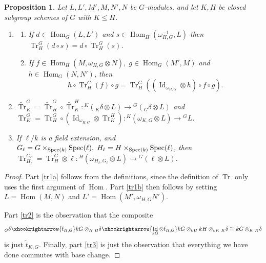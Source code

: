 \documentclass[12pt]{amsart}
\newtheorem{proposition}[theorem]{Proposition}
\theoremstyle{definition}
\newcommand{\Spec}{{\rm Spec }}
\DeclareMathOperator{\Hom}{Hom}
\DeclareMathOperator{\Tr}{Tr}
\DeclareMathOperator{\ide}{Id}
\begin{document}
\begin{proposition}\label{pr:properties-tr}
Let $L,L',M',M,N',N$ be $G$-modules, and let $K,H$ be closed subgroup schemes of $G$ with $K\leq H$.

\begin{enumerate}
\item 
\begin{enumerate}
	\item \label{tr1a}
	If $d \in \Hom_G(L,L')$ and $ s \in \Hom_H(\omega^{-1}_{H,G}, L)$ then $\Tr^G_H (d \circ s) = d \circ \Tr^G_H(s)$.
	\item \label{tr1b}
If $f \in \Hom_H (M,  \omega_{H,G} \otimes N), \; g \in \Hom_G (M',M)$ and $h \in \Hom_G (N,N')$, then 
\[
h \circ \Tr_H^G(f)\circ g = \Tr_H^G( ( \ide_{\omega_{H,G}} \otimes h) \circ f \circ g).
\]
\end{enumerate}

\item \label{tr2} $\tilde{\Tr}^G_K = \tilde{\Tr}^G_H \circ \tilde{\Tr}^H_K \! :  {}^K({}_K \delta  \otimes L) \rightarrow {}^G({}_G \delta  \otimes L)$ and 
$\Tr^G_K = \Tr^G_H \circ (\ide _{\omega_{H,G}} \otimes \Tr^H_K) \! :  {}^K( \omega_{K,G}  \otimes L) \rightarrow {}^GL$. 

\item \label{tr3} If $\ell /k$  is a field extension, and $G_\ell=G\times_{\Spec (k)} \Spec (\ell),\;H_\ell=H\times_{\Spec (k)} \Spec (\ell)$, then $  \Tr_{H_\ell}^{G_\ell} = \Tr_{H}^G \otimes \ell \! : 
{}^H(\omega_{H_\ell,G_\ell} \otimes L) \rightarrow {}^G(\ell \otimes L)$.

\end{enumerate}
\end{proposition}

\begin{proof}
	
	Part \ref{tr1a} follows from the definitions, since the definition of $\Tr$ only uses the first argument of $\Hom$. Part \ref{tr1b} then follows by setting $L= \Hom(M,N)$ and $L'=\Hom(M',\omega_{H,G}N')$.
	
	Part \ref{tr2} is the observation that the composite
	\[ {}_G \delta \xhookrightarrow{\tilde{t}_{H,G}} kG \otimes _H {}_H \delta \xhookrightarrow{\ide_{kG} \otimes \tilde{t}_{H,G}} kG \otimes_{kH}kH \otimes _{kK} {}_K \delta \cong kG \otimes_K {}_K \delta \]
	is just $\tilde{t}_{K,G}$.
	Finally,  part \ref{tr3} is just the observation that everything we have done commutes with base change.
\end{proof}
\end{document}
